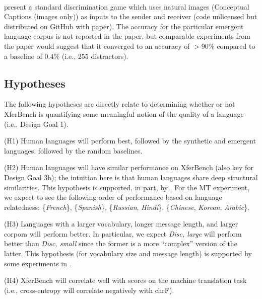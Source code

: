 
\paragraph{\citet{yao2022linking}} present a standard discrimination game which uses natural images (Conceptual Captions \citep{sharma-etal-2018-conceptual} (images only)) as inputs to the sender and receiver (code unlicensed but distributed on GitHub with paper).
The accuracy for the particular emergent language corpus is not reported in the paper, but comparable experiments from the paper would suggest that it converged to an accuracy of ${>}90\%$ compared to a baseline of $0.4\%$ (i.e., $255$ distractors).

\subsection{Hypotheses}
\unskip\label{sec:hypotheses}

The following hypotheses are directly relate to determining whether or not XferBench is quantifying some meaningful notion of the quality of a language (i.e., Design Goal 1).

(H1) Human languages will perform best, followed by the synthetic and emergent languages, followed by the random baselines.

(H2) Human languages will have similar performance on XferBench (also key for Design Goal 3b);
  the intuition here is that human languages share deep structural similarities.
  This hypothesis is supported, in part, by \citet{artetxe-etal-2020-cross}.
  For the MT experiment, we expect to see the following order of performance based on language relatedness:
    \{\emph{French}\},
    \{\emph{Spanish}\},
    \{\emph{Russian}, \emph{Hindi}\},
    \{\emph{Chinese}, \emph{Korean}, \emph{Arabic}\}.

(H3) Languages with a larger vocabulary, longer message length, and larger corpora will perform better.
  In particular, we expect \emph{Disc, large} will perform better than \emph{Disc, small} since the former is a more ``complex'' version of the latter.
  This hypothesis (for vocabulary size and message length) is supported by some experiments in \citet[app.\@ B.4]{yao2022linking}.

(H4) XferBench will correlate well with scores on the machine translation task (i.e., cross-entropy will correlate negatively with chrF).
